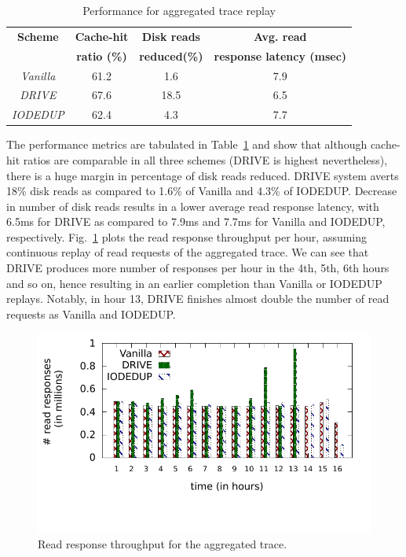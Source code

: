 \begin{table}[h]
\caption{Performance for aggregated trace replay}
\label{tab:aggregate-hw}
\centering
\begin{tabular}{|c|c|c|c|} \hline
\textbf{Scheme} & \textbf{Cache-hit} & \textbf{Disk reads} & \textbf{Avg. read}  \\
\textbf{} & \textbf{ratio (\%)} & \textbf{reduced(\%)} & \textbf{response latency (msec)}  \\ \hline
\textit{Vanilla} & 61.2 & 1.6 & 7.9 \\ \hline
\textit{DRIVE} & 67.6 & 18.5 & 6.5 \\ \hline
\textit{IODEDUP} & 62.4 & 4.3  & 7.7 \\ \hline
\end{tabular}
\end{table}

The performance metrics are tabulated in 
Table~\ref{tab:aggregate-hw} and show that although cache-hit ratios
are comparable in all three schemes (DRIVE is highest nevertheless),
there is a huge margin in percentage of disk reads reduced. DRIVE system
averts 18\% disk reads as compared to 1.6\% of Vanilla and 4.3\% of IODEDUP.
Decrease in number of disk reads results in a lower average 
read response latency, with 6.5ms for DRIVE as compared to
7.9ms and 7.7ms for Vanilla and IODEDUP, respectively.
Fig.~\ref{fig:aggregate-hw-time-series} plots the read response throughput
per hour, assuming continuous replay of read requests of the aggregated trace.
We can see that DRIVE produces more number of responses per hour in the 4th,
5th, 6th hours and so on, hence resulting in an earlier completion than
Vanilla or IODEDUP replays. Notably, in hour 13, DRIVE finishes almost
double the number of read requests as Vanilla and IODEDUP.

\begin{figure}[h]
\centering
\includegraphics[scale=0.90]{confided-figures/aggregate-hw-replay/reads-writes/timeseriesperf-hour.pdf}
\vspace{-0.6in}
\caption{Read response throughput for the aggregated trace.}
\label{fig:aggregate-hw-time-series}
\end{figure}

